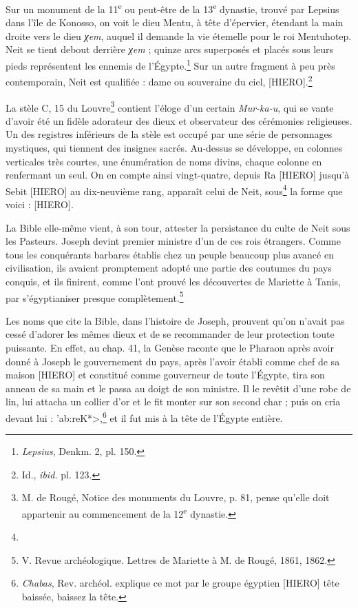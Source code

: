 \documentclass[a4paper, 11pt, oneside]{article}
\begin{document}
Sur un monument de la 11\textsuperscript{e} ou peut-être de la 13\textsuperscript{e} dynastie, trouvé par Lepsius dans l'île de Konosso, on voit le dieu Mentu, à tête d'épervier, étendant la main droite vers le dieu \emph{χem}, auquel il demande la vie étemelle pour le roi Mentuhotep. Neit se tient debout derrière \emph{χem} ; quinze arcs superposés et placés sous leurs pieds représentent les ennemis de l'Égypte.\footnote{\emph{Lepsius}, Denkm. 2, pl. 150.} Sur un autre fragment à peu près contemporain, Neit est qualifiée : dame ou souveraine du ciel, [HIERO].\footnote{Id., \emph{ibid.} pl. 123.}

La stèle C, 15 du Louvre\footnote{M. de Rougé, Notice des monuments du Louvre, p. 81, pense qu'elle doit appartenir au commencement de la 12\textsuperscript{e} dynastie.} contient l'éloge d'un certain \emph{Mur-ka-u}, qui se vante d'avoir été un fidèle adorateur des dieux et observateur des cérémonies religieuses. Un des registres inférieurs de la stèle est occupé par une série de personnages mystiques, qui tiennent des insignes sacrés. Au-dessus se développe, en colonnes verticales très courtes, une énumération de noms divins, chaque colonne en renfermant un seul. On en compte ainsi vingt-quatre, depuis Ra [HIERO] jusqu'à Sebit [HIERO] au dix-neuvième rang, apparaît celui de Neit, sous\footnote{} la forme que voici : [HIERO].

La Bible elle-même vient, à son tour, attester la persistance du culte de Neit sous les Pasteurs. Joseph devint premier ministre d'un de ces rois étrangers. Comme tous les conquérants barbares établis chez un peuple beaucoup plus avancé en civilisation, ils avaient promptement adopté une partie des coutumes du pays conquis, et ils finirent, comme l'ont prouvé les découvertes de Mariette à Tanis, par s'égyptianiser presque complètement.\footnote{V. Revue archéologique. Lettres de Mariette à M. de Rougé, 1861, 1862.}

Les noms que cite la Bible, dans l'histoire de Joseph, prouvent qu'on n'avait pas cessé d'adorer les mêmes dieux et de se recommander de leur protection toute puissante. En effet, au chap. 41, la Genèse raconte que le Pharaon après avoir donné à Joseph le gouvernement du pays, après l'avoir établi comme chef de sa maison [HIERO] et constitué comme gouverneur de toute l'Égypte, tira son anneau de sa main et le passa au doigt de son ministre. Il le revêtit d'une robe de lin, lui attacha un collier d'or et le fit monter sur son second char ; puis on cria devant lui : \foreignlanguage{hebrew}{\<'ab:reK*>},\footnote{\emph{Chabas}, Rev. archéol. explique ce mot par le groupe égyptien [HIERO] tête baissée, baissez la tête.} et il fut mis à la tête de l'Égypte entière.
\end{document}
